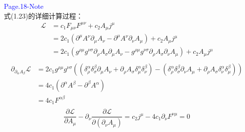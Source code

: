 \documentclass[12pt, a4paper, oneside]{ctexart}
\begin{document}
\textcolor{blue}{Page.18-Note}\\
式(1.23)的详细计算过程：
\[\begin{aligned}
        \mathcal{L} & ={{c}_{1}}{{F}_{\mu \nu }}{{F}^{\mu \nu }}+{{c}_{2}}{{A}_{\mu }}{{j}^{\mu }}                                                                                                                                                                                                  \\
                    & =2{{c}_{1}}\left( {{\partial }^{\mu }}{{A}^{\nu }}{{\partial }_{\mu }}{{A}_{\nu }}-{{\partial }^{\mu }}{{A}^{\nu }}{{\partial }_{\nu }}{{A}_{\mu }} \right)+{{c}_{2}}{{A}_{\mu }}{{j}^{\mu }}                                                                                 \\
                    & =2{{c}_{1}}\left( {{g}^{\rho \mu }}{{g}^{\nu \sigma }}{{\partial }_{\rho }}{{A}_{\sigma }}{{\partial }_{\mu }}{{A}_{\nu }}-{{g}^{\rho \mu }}{{g}^{\nu \sigma }}{{\partial }_{\rho }}{{A}_{\sigma }}{{\partial }_{\nu }}{{A}_{\mu }} \right)+{{c}_{2}}{{A}_{\mu }}{{j}^{\mu }} \\
    \end{aligned}\]
\[\begin{aligned}
        {{\partial }_{{{\partial }_{\alpha }}{{A}_{\beta }}}}\mathcal{L} & =2{{c}_{1}}{{g}^{\rho \mu }}{{g}^{\nu \sigma }}\left( \left( \delta _{\rho }^{\alpha }\delta _{\sigma }^{\beta }{{\partial }_{\mu }}{{A}_{\nu }}+{{\partial }_{\rho }}{{A}_{\sigma }}\delta _{\mu }^{\alpha }\delta _{\nu }^{\beta } \right)-\left( \delta _{\rho }^{\alpha }\delta _{\sigma }^{\beta }{{\partial }_{\nu }}{{A}_{\mu }}+{{\partial }_{\rho }}{{A}_{\sigma }}\delta _{\nu }^{\alpha }\delta _{\mu }^{\beta } \right) \right) \\
                                                                         & =4{{c}_{1}}\left( {{\partial }^{\alpha }}{{A}^{\beta }}-{{\partial }^{\beta }}{{A}^{\alpha }} \right)                                                                                                                                                                                                                                                                                                                                       \\
                                                                         & =4{{c}_{1}}{{F}^{\alpha \beta }}                                                                                                                                                                                                                                                                                                                                                                                                            \\
    \end{aligned}\]
\[\frac{\partial \mathcal{L}}{\partial {{A}_{\mu }}}-{{\partial }_{\nu }}\frac{\partial \mathcal{L}}{\partial \left( {{\partial }_{\nu }}{{A}_{\mu }} \right)}={{c}_{2}}{{j}^{\mu }}-4{{c}_{1}}{{\partial }_{\nu }}{{F}^{\nu \mu }}=0\]
\end{document}
